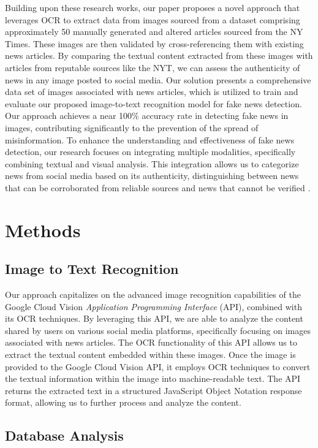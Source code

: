 \documentclass[conference]{IEEEtran}
\begin{document}
Building upon these research works, our paper proposes a novel approach that leverages OCR to extract data from images sourced from a dataset comprising approximately 50 manually generated and altered articles sourced from the NY Times. These images are then validated by cross-referencing them with existing news articles. By comparing the textual content extracted from these images with articles from reputable sources like the NYT, we can assess the authenticity of news in any image posted to social media. Our solution presents a comprehensive data set of images associated with news articles, which is utilized to train and evaluate our proposed image-to-text recognition model for fake news detection. Our approach achieves a near 100\% accuracy rate in detecting fake news in images, contributing significantly to the prevention of the spread of misinformation. To enhance the understanding and effectiveness of fake news detection, our research focuses on integrating multiple modalities, specifically combining textual and visual analysis. This integration allows us to categorize news from social media based on its authenticity, distinguishing between news that can be corroborated from reliable sources and news that cannot be verified \cite{git}.

\section{Methods}

\subsection{Image to Text Recognition}

Our approach capitalizes on the advanced image recognition capabilities of the Google Cloud Vision \emph{Application Programming Interface} (API), combined with its OCR techniques. By leveraging this API, we are able to analyze the content shared by users on various social media platforms, specifically focusing on images associated with news articles. The OCR functionality of this API allows us to extract the textual content embedded within these images. Once the image is provided to the Google Cloud Vision API, it employs OCR techniques to convert the textual information within the image into machine-readable text. The API returns the extracted text in a structured JavaScript Object Notation response format, allowing us to further process and analyze the content.

\subsection{Database Analysis}
\end{document}
